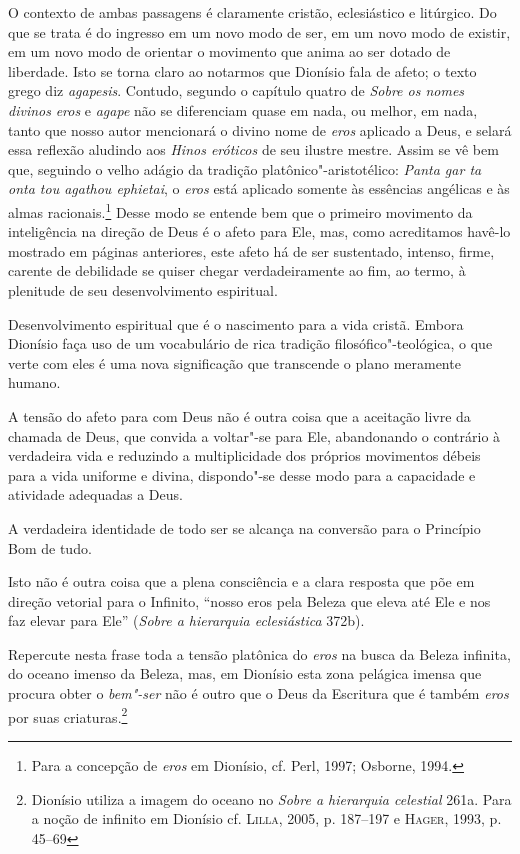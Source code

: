 O contexto de ambas passagens é claramente cristão, eclesiástico e litúrgico. Do
que se trata é do ingresso em um novo modo de ser, em um novo modo de existir,
em um novo modo de orientar o movimento que anima ao ser dotado de liberdade.
Isto se torna claro ao notarmos que Dionísio fala de afeto; o texto grego diz
\textit{agapesis}. Contudo, segundo o capítulo quatro de \textit{Sobre os nomes
divinos} \textit{eros} e \textit{agape} não se diferenciam quase em nada, ou
melhor, em nada, tanto que nosso autor mencionará o divino nome de \textit{eros}
aplicado a Deus, e selará essa reflexão aludindo aos \textit{Hinos eróticos} de
seu ilustre mestre. Assim se vê bem que, seguindo o velho adágio da tradição
platônico"-aristotélico: \textit{Panta gar ta onta tou agathou ephietai}, o
\textit{eros}
está aplicado somente às essências angélicas e às almas racionais.\footnote{
  Para a concepção de \textit{eros} em Dionísio, cf.  Perl, 1997; Osborne, 1994.}
Desse modo se
entende bem que o primeiro movimento da inteligência na direção de Deus é o
afeto para Ele, mas, como acreditamos havê-lo mostrado em páginas anteriores,
este afeto há de ser sustentado, intenso, firme, carente de debilidade se quiser
chegar verdadeiramente ao fim, ao termo, à plenitude de seu desenvolvimento
espiritual. 

Desenvolvimento espiritual que é o nascimento para a vida cristã. Embora
Dionísio faça uso de um vocabulário de rica tradição filosófico"-teológica, o que
verte com eles é uma nova significação que transcende o plano meramente humano. 

A tensão do afeto para com Deus não é outra coisa que a aceitação livre da
chamada de Deus, que convida a voltar"-se para Ele, abandonando o contrário à
verdadeira vida e reduzindo a multiplicidade dos próprios movimentos débeis para
a vida uniforme e divina, dispondo"-se desse modo para a capacidade e atividade
adequadas a Deus. 

A verdadeira identidade de todo ser se alcança na conversão para o Princípio Bom
de tudo. 

Isto não é outra coisa que a plena consciência e a clara resposta que põe em
direção vetorial para o Infinito, ``nosso eros pela Beleza que eleva até Ele e
nos faz elevar para Ele'' (\textit{Sobre a hierarquia eclesiástica} 372b).

Repercute nesta frase toda a tensão platônica do \textit{eros} na busca da
Beleza infinita, do oceano imenso da Beleza, mas, em Dionísio esta zona pelágica
imensa que procura obter o \textit{bem"-ser} não é outro que o Deus da Escritura
que é também \textit{eros} por suas criaturas.\footnote{
  Dionísio utiliza a imagem do oceano no \textit{Sobre a hierarquia celestial}
  261a. Para a noção de infinito em Dionísio cf. \textsc{Lilla}, 2005,
p. 187--197 e \textsc{Hager}, 1993, p. 45--69}

